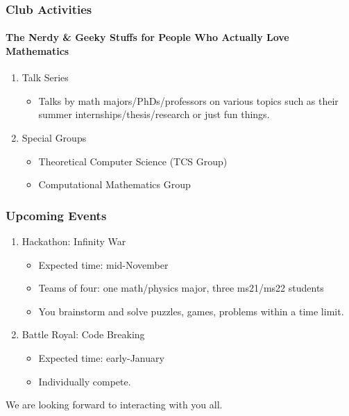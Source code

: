 \documentclass[10pt, aspectratio=43,leqno]{beamer}
\begin{document}
\begin{frame}
  \frametitle{Club Activities}
  \framesubtitle{The Nerdy \& Geeky Stuffs for People Who Actually Love Mathematics}
  \pause
\begin{enumerate}
\item\label{item:6} Talk Series
\begin{itemize}
\item Talks by math majors/PhDs/professors on various topics such as their summer internships/thesis/research or just fun things.
\end{itemize}
\pause 
\item\label{item:7} Special Groups
\begin{itemize}
\item Theoretical Computer Science (TCS Group)
\item Computational Mathematics Group
\end{itemize}
\end{enumerate}
\end{frame}

\begin{frame}
  \frametitle{Upcoming Events}
  \pause
\begin{enumerate}
\item\label{item:8} Hackathon: Infinity War 
\begin{itemize}
\item Expected time: mid-November 
\item Teams of four: one math/physics major, three ms21/ms22 students
\item You brainstorm and solve puzzles, games, problems within a time limit.
\end{itemize}
\pause
\item\label{item:9} Battle Royal: Code Breaking 
\begin{itemize} 
\item Expected time: early-January
\item Individually compete.
\end{itemize}
\end{enumerate}
\end{frame}

\begin{frame}
  We are looking forward to interacting with you all.
\end{frame}
\end{document}
